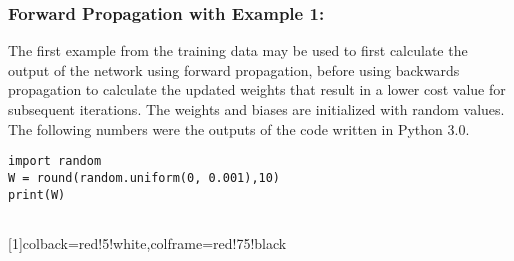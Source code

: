 \documentclass[12pt,a4paper]{article}
\begin{document}
\subsubsection{Forward Propagation with Example 1:}

The first example from the training data may be used to first calculate the output of the network using forward propagation, before using backwards propagation to calculate the updated weights that result in a lower cost value for subsequent iterations. The weights and biases are initialized with random values. The following numbers were the outputs of the code written in Python 3.0.



\begin{verbatim}
import random
W = round(random.uniform(0, 0.001),10)
print(W)
 
\end{verbatim}




[1]{colback=red!5!white,colframe=red!75!black}
\end{document}
